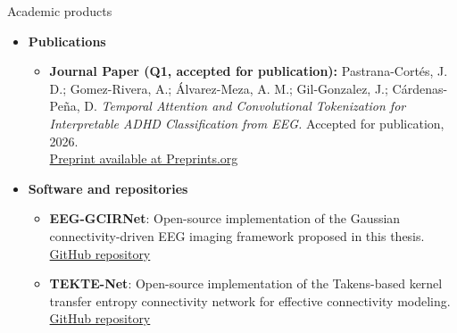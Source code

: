 \documentclass[aspectratio=169]{beamer}
\begin{document}
\begin{frame}{Academic products}
\begin{itemize}

  \item \textbf{Publications}
  \begin{itemize}\itemsep3pt

    \item \textbf{Journal Paper (Q1, accepted for publication):} Pastrana-Cortés, J. D.; Gomez-Rivera, A.; Álvarez-Meza, A. M.; Gil-Gonzalez, J.; Cárdenas-Peña, D.
    \emph{Temporal Attention and Convolutional Tokenization for Interpretable ADHD Classification from EEG.}
    Accepted for publication, 2026.\\
    \href{https://www.preprints.org/frontend/manuscript/8cf77def865d68c2bf3c9887e397e670/download_pub}
    {Preprint available at Preprints.org}

  \end{itemize}

  \vspace{0.12cm}

  \item \textbf{Software and repositories}
  \begin{itemize}\itemsep3pt

    \item \textbf{EEG-GCIRNet}: Open-source implementation of the Gaussian connectivity-driven EEG imaging framework proposed in this thesis.\\
    \href{https://github.com/alegomezri/EEG-GCIRNet}{GitHub repository}

    \item \textbf{TEKTE-Net}: Open-source implementation of the Takens-based kernel transfer entropy connectivity network for effective connectivity modeling.\\
    \href{https://github.com/alegomezri/TEKTE-Net}{GitHub repository}

  \end{itemize}

\end{itemize}
\end{frame}
\end{document}
